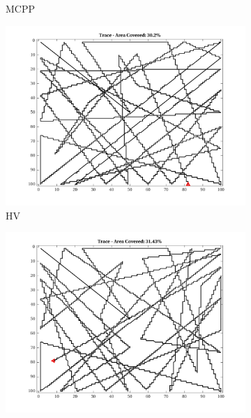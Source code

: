 \begin{figure}[htb!]
\begin{subfigure}[t]{0.25\textwidth}
        \captionsetup{skip=0.20\baselineskip,size=footnotesize}
        \caption{MCPP}
    \end{subfigure}%
    \begin{subfigure}[t]{0.25\textwidth}
        \centering
        \includegraphics[width=\linewidth]{figures/path_nhv_30p_100x100_sf_100_seed_1.png}
        \captionsetup{skip=0.20\baselineskip,size=footnotesize}
        \caption{HV}
    \end{subfigure}%
    \begin{subfigure}[t]{0.25\textwidth}
        \centering
        \includegraphics[width=\linewidth]{figures/path_nnhv_30p_100x100_sf_100_seed_1.png}
        \captionsetup{skip=0.20\baselineskip,size=footnotesize}

\end{subfigure}
\end{figure}
